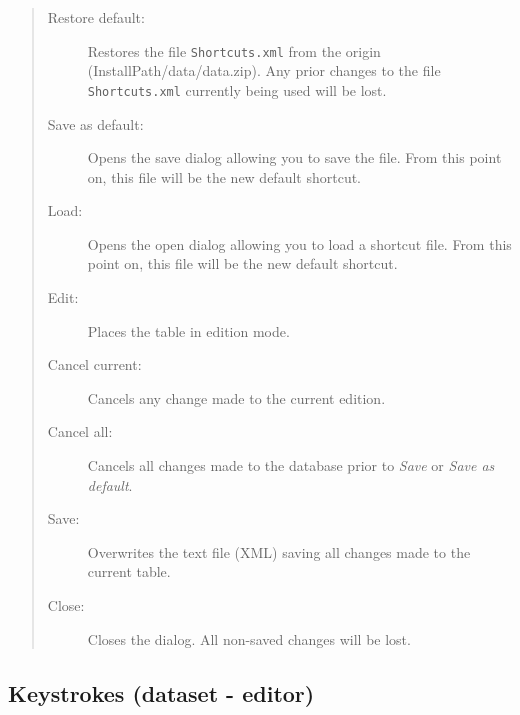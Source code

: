 \begin{quote}
  \begin{footnotesize}
    \begin{description}
      \item[Restore default:]
        Restores the file \texttt{Shortcuts.xml} from the origin
        (InstallPath/data/data.zip). Any prior changes to the file
        \texttt{Shortcuts.xml} currently being used will be lost.
      \item[Save as default:]
        Opens the save dialog allowing you to save the file. From
        this point on, this file will be the new default shortcut.
      \item[Load:]
        Opens the open dialog allowing you to load a shortcut file.
        From this point on, this file will be the new default shortcut.
      \item[Edit:]
        Places the table in edition mode.
      \item[Cancel current:]
        Cancels any change made to the current edition.
      \item[Cancel all:]
        Cancels all changes made to the database prior to \textit{Save} or \textit{Save as default}.
      \item[Save:]
        Overwrites the text file (XML) saving all changes made to the current table.
      \item[Close:]
        Closes the dialog. All non-saved changes will be lost.
    \end{description}
  \end{footnotesize}
\end{quote}

\subsection{Keystrokes (dataset - editor)}

